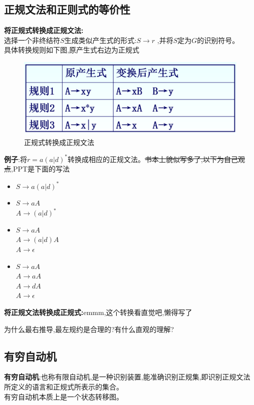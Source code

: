 \subsection{正规文法和正则式的等价性}
\textbf{将正规式转换成正规文法:}\\
选择一个非终结符$S$生成类似产生式的形式:$S\to r$ ,并将$S$定为$G$的识别符号。\\

具体转换规则如下图,原产生式右边为正规式

\begin{figure}[H]
 \centering
 \includegraphics[scale = 0.3]{assets/CompilerConstructionPrinciples-part1_59a3f.png}
 \caption{正规式转换成正规文法}
\end{figure}

\textbf{例子}:将$r = a(a|d)^*$转换成相应的正规文法。{\color{red}\sout{书本上貌似写多了,以下为自己观点},PPT是下面的写法}
\begin{itemize}
 \item
       $S\to a(a|d)^*$
 \item
       $S\to aA$\\
       $A \to (a|d)^*$
 \item
       $S \to aA$\\
       $A \to (a|d)A$  \\
       $A \to \epsilon$
 \item
       $S \to aA$\\
       $A \to aA$\\
       $A \to dA$\\
       $A \to \epsilon$
\end{itemize}

\textbf{将正规文法转换成正规式:}emmm,这个转换看直觉吧,懒得写了

{\color{red}为什么最右推导,最左规约是合理的?有什么直观的理解?}

\subsection{有穷自动机}
\textbf{有穷自动机}:也称有限自动机,是一种识别装置,能准确识别正规集,即识别正规文法所定义的语言和正规式所表示的集合。\\
有穷自动机本质上是一个状态转移图。


